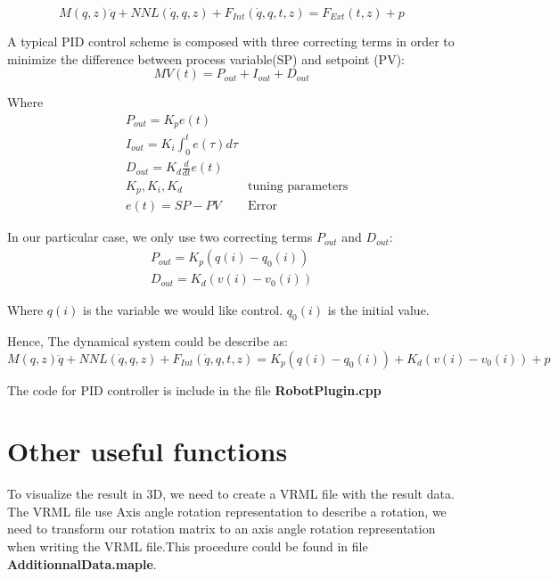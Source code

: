 \begin{equation}
M(q,z)\ddot{q}+NNL(\dot{q},q,z)+F_{Int}(\dot{q},q,t,z)=F_{Ext}(t,z)+p
\label{LNLDS}
\end{equation}

A typical PID control scheme is composed with three correcting terms in order to minimize the difference between  process variable(SP) and setpoint (PV):
\begin{equation}
MV(t)= P_{out} +I_{out}+ D_{out}
\end{equation}

Where 
\begin{eqnarray}
&P_{out}=K_pe(t)& \\
&I_{out}=K_i\int_0^{t} e(\tau) d\tau&\\
&D_{out}=K_d\frac{d}{dt}e(t)&\\
&K_p,K_i,K_d \quad& \text{tuning parameters}\\
&e(t)=SP-PV& \text{Error}
\end{eqnarray}

In our particular case, we only use two correcting terms $P_{out}$ and $D_{out}$:
\begin{eqnarray}
&P_{out}=K_p(q(i)-q_0(i))&\\
&D_{out}=K_d(v(i)-v_0(i))&
\end{eqnarray}

Where $q(i)$ is the variable we would like control. $q_0(i)$ is the initial value.

Hence, The dynamical system could be describe as:
\begin{equation}
M(q,z)\ddot{q}+NNL(\dot{q},q,z)+F_{Int}(\dot{q},q,t,z)=K_p(q(i)-q_0(i))+K_d(v(i)-v_0(i))+p
\label{LNLDSPID}
\end{equation}

The code for PID controller is include in the file  \textbf{RobotPlugin.cpp}
 


\section{Other useful functions}

To visualize the result in 3D, we need to create a VRML file with the result data. The VRML file use Axis angle rotation representation to describe a rotation, we need to transform our rotation matrix to an axis angle rotation representation when writing the VRML file.This procedure could be found in file \textbf{AdditionnalData.maple}.











